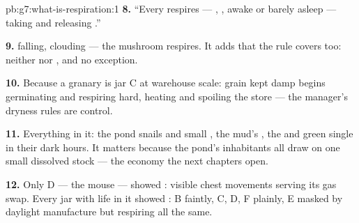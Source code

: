 \begin{solution}{pb:g7:what-is-respiration:1}
\textbf{8.} ``Every  respires --- ,
,  awake or barely asleep --- taking  and
releasing .''

\textbf{9.}  falling,  clouding --- the
mushroom respires. It adds that the rule covers  too:
neither  nor , and no exception.

\textbf{10.} Because a granary is jar C at warehouse scale:
grain kept damp begins germinating and respiring hard,
heating and spoiling the store --- the manager's dryness
rules are  control.

\textbf{11.} Everything in it: the pond snails and small
, the mud's , the  and green
single  in their dark hours. It matters because the
pond's inhabitants all draw on one small dissolved 
stock --- the economy the next chapters open.

\textbf{12.} Only D --- the mouse --- showed :
visible chest movements serving its gas swap. Every jar
with life in it showed : B faintly, C, D, F
plainly, E masked by daylight manufacture but respiring
all the same.
\end{solution}
